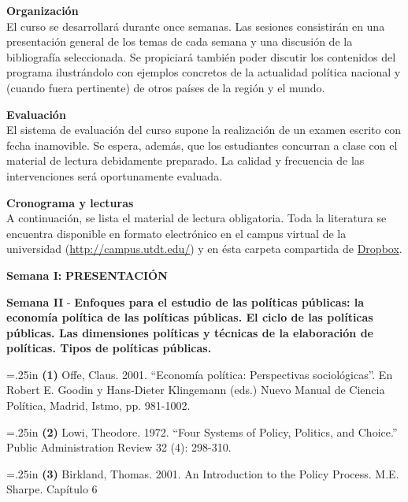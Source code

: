 \documentclass[11pt]{article}
\begin{document}
\vspace{.3cm}

\textbf {\large Organización}  \\

El curso se desarrollará durante once semanas. Las sesiones consistirán en una presentación general de los temas de cada semana y una  discusión de la bibliografía seleccionada. Se propiciará también poder discutir los contenidos del programa ilustrándolo con ejemplos concretos de la actualidad política nacional y (cuando fuera pertinente) de otros países de la región y el mundo. 

\vspace{.3cm}

\textbf {\large Evaluación} \\

El sistema de evaluación del curso supone la realización de un examen escrito con fecha inamovible. Se espera, además, que los estudiantes concurran a clase con el material de lectura debidamente preparado. La calidad y frecuencia de las intervenciones será oportunamente evaluada.
\clearpage


\textbf {\large Cronograma y lecturas} \\ A continuación, se lista el material de lectura obligatoria. Toda la literatura se encuentra disponible en formato electrónico en el campus virtual de la universidad (\href{http://campus.utdt.edu/}{http://campus.utdt.edu/}) y en ésta carpeta compartida de \href{https://www.dropbox.com/sh/8vwheg39c0vzuj4/AACnMI5McG29M_7vontcb0rJa?dl=0}{Dropbox}.

\vspace{.5cm}

\textbf{Semana I:}\textbf{ PRESENTACIÓN}
\vspace{.5cm}

\textbf{Semana II} - \textbf{Enfoques para el estudio de las políticas públicas: la economía política de las políticas públicas. El ciclo de las políticas públicas. Las dimensiones políticas y
técnicas de la elaboración de políticas. Tipos de políticas públicas.}

\begin{onehalfspacing}
\hangindent=.25in \noindent \textbf{(1)} Offe, Claus. 2001. “Economía política: Perspectivas sociológicas”. En Robert E. Goodin y Hans-Dieter Klingemann (eds.) Nuevo Manual de Ciencia Política, Madrid, Istmo, pp. 981-1002.

\hangindent=.25in \noindent \textbf{(2)} Lowi, Theodore. 1972. “Four Systems of Policy, Politics, and Choice.” Public Administration
Review 32 (4): 298-310.

\hangindent=.25in \noindent \textbf{(3)} Birkland, Thomas. 2001. An Introduction to the Policy Process. M.E. Sharpe. Capítulo 6
\end{onehalfspacing}
\end{document}
